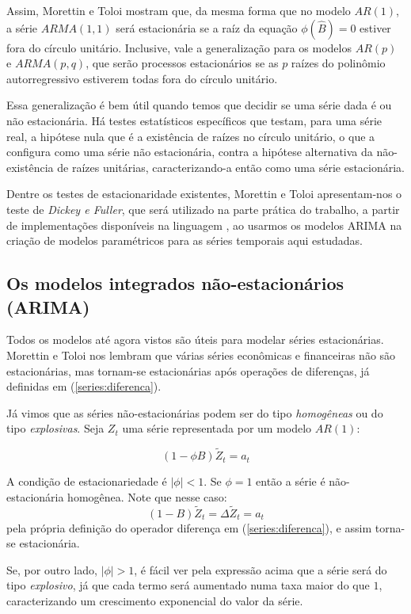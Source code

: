 Assim, Morettin e Toloi \citep{morettin} mostram que, da mesma forma que no modelo $AR(1)$, a série $ARMA(1,1)$ será estacionária se a raíz da equação $\phi(\hat{B}) = 0$ estiver fora do círculo unitário. Inclusive, vale a generalização para os modelos $AR(p)$ e $ARMA(p,q)$, que serão processos estacionários se as $p$ raízes do polinômio autorregressivo estiverem todas fora do círculo unitário.

Essa generalização é bem útil quando temos que decidir se uma série dada é ou não estacionária. Há testes estatísticos específicos que testam, para uma série real, a hipótese nula que é a existência de raízes no círculo unitário, o que a configura como uma série não estacionária, contra a hipótese alternativa da não-existência de raízes unitárias, caracterizando-a então como uma série estacionária.

Dentre os testes de estacionaridade existentes, Morettin e Toloi \citep{morettin} apresentam-nos o teste de \emph{Dickey e Fuller}, que será utilizado na parte prática do trabalho, a partir de implementações disponíveis na linguagem , ao usarmos os modelos ARIMA na criação de modelos paramétricos para as séries temporais aqui estudadas.


\subsection{Os modelos integrados não-estacionários (ARIMA)}

Todos os modelos até agora vistos são úteis para modelar séries estacionárias. Morettin e Toloi \citep{morettin} nos lembram que várias séries econômicas e financeiras não são estacionárias, mas tornam-se estacionárias após operações de diferenças, já definidas em (\ref{series:diferenca}). 

Já vimos que as séries não-estacionárias podem ser do tipo \emph{homogêneas} ou do tipo \emph{explosivas}. Seja $Z_t$ uma série representada por um modelo $AR(1)$:

\[
(1 - \phi B)\tilde{Z}_t = a_t
\]

A condição de estacionariedade é $|\phi| < 1$. Se $\phi = 1$ então a série é não-estacionária homogênea. Note que nesse caso: 
\[ (1 - B)\tilde{Z}_t = \Delta \tilde{Z}_t = a_t \]
pela própria definição do operador diferença em (\ref{series:diferenca}), e assim torna-se estacionária. 

Se, por outro lado, $|\phi| > 1$, é fácil ver pela expressão acima que a série será do tipo \emph{explosivo}, já que cada termo será aumentado numa taxa maior do que $1$, caracterizando um crescimento exponencial do valor da série.

